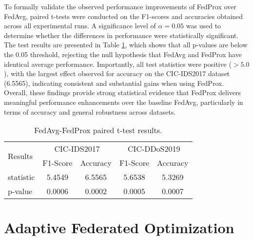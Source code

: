 To formally validate the observed performance improvements of FedProx over FedAvg, paired t-tests were conducted on the F1-scores and accuracies obtained across all experimental runs. A significance level of $\alpha=0.05$ was used to determine whether the differences in performance were statistically significant. The test results are presented in Table \ref{tbl:fedavg_fedprox_compare}, which shows that all p-values are below the 0.05 threshold, rejecting the null hypothesis that FedAvg and FedProx have identical average performance. Importantly, all test statistics were positive ($>5.0$), with the largest effect observed for accuracy on the CIC-IDS2017 dataset (6.5565), indicating consistent and substantial gains when using FedProx. Overall, these findings provide strong statistical evidence that FedProx delivers meaningful performance enhancements over the baseline FedAvg, particularly in terms of accuracy and general robustness across datasets.

\begin{table}[h]
    \caption{FedAvg-FedProx paired t-test results.}
    \centering
    \begin{tabular}{l|c|c|c|c}
        \multirow{2}{*}{Results} & \multicolumn{2}{|c|}{CIC-IDS2017} & \multicolumn{2}{|c}{CIC-DDoS2019} \\
        \cline{2-5} & F1-Score & Accuracy & F1-Score & Accuracy \\
        \hline\hline
        statistic & 5.4549 & 6.5565 & 5.6538 & 5.3269 \\
        p-value & 0.0006 & 0.0002 & 0.0005 & 0.0007 \\
    \end{tabular}
    \label{tbl:fedavg_fedprox_compare}
\end{table}

\section{Adaptive Federated Optimization}

